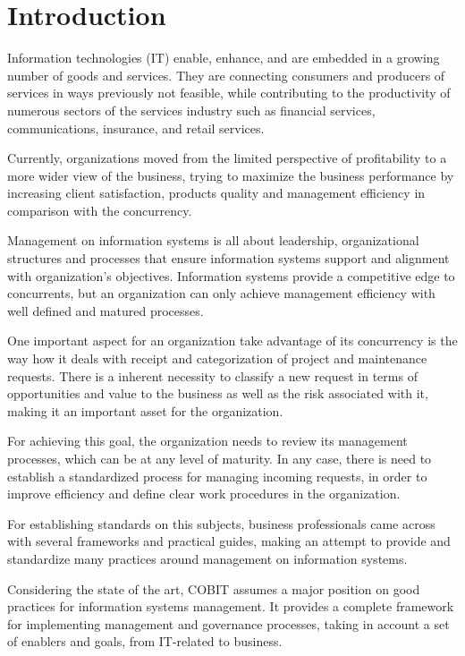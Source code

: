
% 
% 

\section{Introduction}

Information technologies (IT) enable, enhance, and are embedded in a growing number of goods and services. They are connecting consumers and producers of services in ways previously not feasible, while contributing to the productivity of numerous sectors of the services industry such as financial services, communications, insurance, and retail services.\par
Currently, organizations moved from the limited perspective of profitability to a more wider view of the business, trying to maximize the business performance by increasing client satisfaction, products quality and management efficiency in comparison with the concurrency.\par
Management on information systems is all about leadership, organizational structures and processes that ensure information systems support and alignment with organization's objectives. Information systems provide a competitive edge to concurrents, but an organization can only achieve management efficiency with well defined and matured processes. \par
One important aspect for an organization take advantage of its concurrency is the way how it deals with receipt and categorization of project and maintenance requests. There is a inherent necessity to classify a new request in terms of opportunities  and value to the business as well as the risk associated with it, making it an important asset for the organization.\par
For achieving this goal, the organization needs to review its management processes, which can be at any level of maturity. In any case, there is need to establish a standardized process for managing incoming requests, in order to improve efficiency and define clear work procedures in the organization.\par
For establishing standards on this subjects, business professionals came across with several frameworks and practical guides, making an attempt to provide and standardize many practices around management on information systems.\par
Considering the state of the art, COBIT assumes a major position on good practices for information systems management. It provides a complete framework for implementing management and governance processes, taking in account a set of enablers and goals, from IT-related to business.\par
